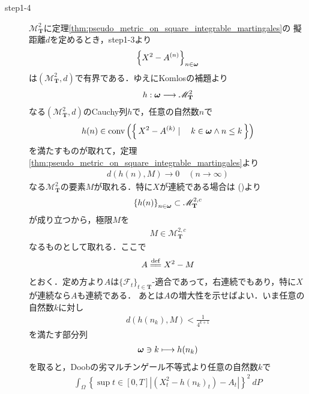\begin{sketch}
\begin{description}
			\item[step1-4]
				$\mathscr{M}^2_{\mathbf{T}}$に定理\ref{thm:pseudo_metric_on_square_integrable_martingales}の
				擬距離$d$を定めるとき，step1-3より
				\begin{align}
					\left\{X^2 - A^{(n)}\right\}_{n \in {\boldsymbol \omega}}
				\end{align}
				は$\left(\mathscr{M}^2_{\mathbf{T}},d\right)$で有界である．ゆえにKomlosの補題より
				\begin{align}
					h:{\boldsymbol \omega} \longrightarrow \mathscr{M}^2_{\mathbf{T}}
				\end{align}
				なる$\left(\mathscr{M}^2_{\mathbf{T}},d\right)$のCauchy列$h$で，任意の自然数$n$で
				\begin{align}
					h(n) \in \operatorname*{conv} \left(\left\{\, X^2-A^{(k)} \mid \quad k \in {\boldsymbol \omega} \wedge n \leq k\, \right\}\right)
					\label{fom:thm_decomposition_of_square_integrable_martingales_5}
				\end{align}
				を満たすものが取れて，定理\ref{thm:pseudo_metric_on_square_integrable_martingales}より
				\begin{align}
					d(h(n),M) \longrightarrow 0\quad (n \longrightarrow \infty)
				\end{align}
				なる$\mathscr{M}^2_{\mathbf{T}}$の要素$M$が取れる．特に$X$が連続である場合は
				()より
				\begin{align}
					\left\{h(n)\right\}_{n \in {\boldsymbol \omega}} \subset \mathscr{M}^{2,c}_{\mathbf{T}}
				\end{align}
				が成り立つから，極限$M$を
				\begin{align}
					M \in \mathscr{M}^{2,c}_{\mathbf{T}}
				\end{align}
				なるものとして取れる．ここで
				\begin{align}
					A \defeq X^2 - M
				\end{align}
				とおく．定め方より$A$は$\{\mathscr{F}_t\}_{t \in \mathbf{T}}$-適合であって，右連続でもあり，特に$X$が連続なら$A$も連続である．
				あとは$A$の増大性を示せばよい．いま任意の自然数$k$に対し
				\begin{align}
					d(h(n_k),M) < \frac{1}{4^{k+1}}
				\end{align}
				を満たす部分列
				\begin{align}
					{\boldsymbol \omega} \ni k \longmapsto h(n_k)
				\end{align}
				を取ると，Doobの劣マルチンゲール不等式より任意の自然数$k$で
				\begin{align}
					\int_\Omega \left\{\sup{t \in [0,T]}{\left|\left(X^2_t - h(n_k)_t\right) - A_t\right|}\right\}^2\ dP

\end{align}
\end{description}
\end{sketch}
